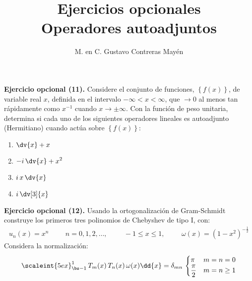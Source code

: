 
\title{Ejercicios opcionales \\[0.3em]  \large{Operadores autoadjuntos} \vspace{-3ex}}
\author{M. en C. Gustavo Contreras Mayén}
\date{ }


\vspace{-4cm}
\maketitle
\fontsize{14}{14}\selectfont

\noindent
\textbf{Ejercicio opcional (11).}
Considere el conjunto de funciones, $\left\{ f (x) \right\}$, de variable real $x$, definida en el intervalo $-\infty < x < \infty$, que $\to 0$ al menos tan rápidamente como $x^{-1}$ cuando $x \to \pm \infty$. Con la función de peso unitaria, determina si cada uno de los siguientes operadores lineales es autoadjunto (Hermitiano) cuando actúa sobre $\left\{ f (x) \right\}$:
\begin{enumerate}[label=\alph*)]
\item $\displaystyle \dv{x} + x$
\item $\displaystyle - i \, \dv{x} + x^{2}$
\item $\displaystyle i \, x \, \dv{x}$
\item $\displaystyle i \, \dv[3]{x}$
\end{enumerate}
\noindent
\textbf{Ejercicio opcional (12).} Usando la ortogonalización de Gram-Schmidt construye los primeros tres polinomios de Chebyshev de tipo I, con:
\begin{align*}
u_{n} (x) = x^{n} \hspace{1cm} n = 0, 1, 2, \ldots, \hspace{1cm} -1 \leq x \leq 1, \hspace{1cm} \omega(x) = (1 - x^{2})^{-\frac{1}{2}}
\end{align*}
Considera la normalización:
\begin{align*}
\scaleint{5ex}_{\bs -1}^{1} \, T_{m}(x) \, T_{n}(x) \, \omega(x) \dd{x} = \delta_{mn} \, \begin{cases}
\pi & m = n = 0 \\
\dfrac{\pi}{2} & m = n \geq 1
\end{cases}
\end{align*}



